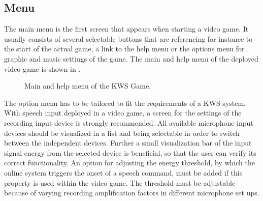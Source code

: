\subsection{Menu}\label{sec:game_design_menu}
The main menu is the first screen that appears when starting a video game. 
It usually consists of several selectable buttons that are referencing for instance to the start of the actual game, a link to the help menu or the options menu for graphic and music settings of the game.
The main and help menu of the deployed video game is shown in .
\begin{figure}[!ht]
  \centering
  \qquad
  \caption{Main and help menu of the KWS Game.}
  \label{fig:game_design_menu_mainhelp}
\end{figure}
\FloatBarrier
\noindent
The option menu has to be tailored to fit the requirements of a KWS system.
With speech input deployed in a video game, a screen for the settings of the recording input device is strongly recommended.
All available microphone input devices should be visualized in a list and being selectable in order to switch between the independent devices.
Further a small visualization bar of the input signal energy from the selected device is beneficial, so that the user can verify its correct functionality.
An option for adjusting the energy threshold, by which the online system triggers the onset of a speech command, must be added if this property is used within the video game.
The threshold must be adjustable because of varying recording amplification factors in different microphone set ups.
